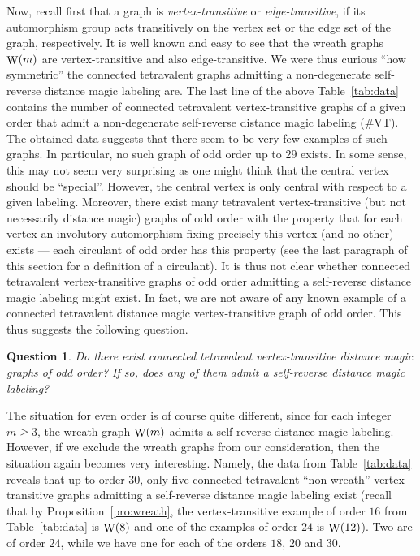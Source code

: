 \documentclass[11 pt,english]{article}
\newcommand{\Wr}{\mathop{\rm W}}
\newtheorem{question}[theorem]{Question}
\theoremstyle{definition}
\begin{document}
Now, recall first that a graph is {\em vertex-transitive} or {\em edge-transitive}, if its automorphism group acts transitively on the vertex set or the edge set of the graph, respectively. It is well known and easy to see that the wreath graphs $\Wr(m)$ are vertex-transitive and also edge-transitive. We were thus curious ``how symmetric'' the connected tetravalent graphs admitting a non-degenerate self-reverse distance magic labeling are. The last line of the above Table~\ref{tab:data} contains the number of connected tetravalent vertex-transitive graphs of a given order that admit a non-degenerate self-reverse distance magic labeling ($\# \text{VT}$). The obtained data suggests that there seem to be very few examples of such graphs. In particular, no such graph of odd order up to $29$ exists. In some sense, this may not seem very surprising as one might think that the central vertex should be ``special''. However, the central vertex is only central with respect to a given labeling. Moreover, there exist many tetravalent vertex-transitive (but not necessarily distance magic) graphs of odd order with the property that for each vertex an involutory automorphism fixing precisely this vertex (and no other) exists --- each circulant of odd order has this property (see the last paragraph of this section for a definition of a circulant). It is thus not clear whether connected tetravalent vertex-transitive graphs of odd order admitting a self-reverse distance magic labeling might exist. In fact, we are not aware of any known example of a connected tetravalent distance magic vertex-transitive graph of odd order. This thus suggests the following question.

\begin{question}
\label{que:VTodd}
Do there exist connected tetravalent vertex-transitive distance magic graphs of odd order? If so, does any of them admit a self-reverse distance magic labeling?
\end{question}

The situation for even order is of course quite different, since for each integer $m \geq 3$, the wreath graph $\Wr(m)$ admits a self-reverse distance magic labeling. However, if we exclude the wreath graphs from our consideration, then the situation again becomes very interesting. Namely, the data from Table~\ref{tab:data} reveals that up to order $30$, only five connected tetravalent ``non-wreath'' vertex-transitive graphs admitting a self-reverse distance magic labeling exist (recall that by Proposition~\ref{pro:wreath}, the vertex-transitive example of order $16$ from Table~\ref{tab:data} is $\Wr(8)$ and one of the examples of order $24$ is $\Wr(12)$). Two are of order $24$, while we have one for each of the orders $18$, $20$ and $30$.
\end{document}
